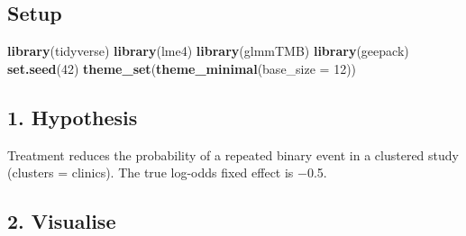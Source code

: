 \documentclass[
]{article}
\newenvironment{Shaded}{\begin{snugshade}}{\end{snugshade}}
\newcommand{\AttributeTok}[1]{\textcolor[rgb]{0.13,0.29,0.53}{#1}}
\newcommand{\DecValTok}[1]{\textcolor[rgb]{0.00,0.00,0.81}{#1}}
\newcommand{\FunctionTok}[1]{\textcolor[rgb]{0.13,0.29,0.53}{\textbf{#1}}}
\newcommand{\NormalTok}[1]{#1}
\begin{document}
\subsection{Setup}\label{setup}

\begin{Shaded}
\begin{Highlighting}[]
\FunctionTok{library}\NormalTok{(tidyverse)}
\FunctionTok{library}\NormalTok{(lme4)}
\FunctionTok{library}\NormalTok{(glmmTMB)}
\FunctionTok{library}\NormalTok{(geepack)}
\FunctionTok{set.seed}\NormalTok{(}\DecValTok{42}\NormalTok{)}
\FunctionTok{theme\_set}\NormalTok{(}\FunctionTok{theme\_minimal}\NormalTok{(}\AttributeTok{base\_size =} \DecValTok{12}\NormalTok{))}
\end{Highlighting}
\end{Shaded}

\subsection{1. Hypothesis}\label{hypothesis}

Treatment reduces the probability of a repeated binary event in a
clustered study (clusters = clinics). The true log-odds fixed effect is
−0.5.

\subsection{2. Visualise}\label{visualise}
\end{document}
